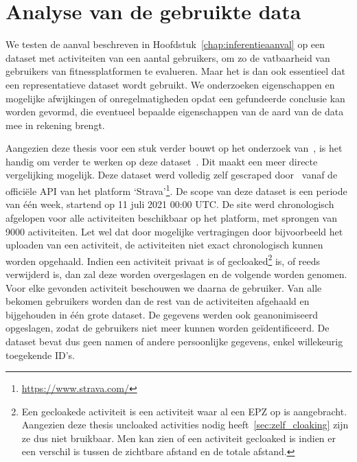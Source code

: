 \chapter{Analyse van de gebruikte data}
We testen de aanval beschreven in Hoofdstuk~\ref{chap:inferentieaanval} op een
dataset met activiteiten van een aantal gebruikers, om zo de vatbaarheid van
gebruikers van fitnessplatformen te evalueren. Maar het is dan ook essentieel
dat een representatieve dataset wordt gebruikt. We onderzoeken eigenschappen en
mogelijke afwijkingen of onregelmatigheden opdat een gefundeerde conclusie kan
worden gevormd, die eventueel bepaalde eigenschappen van de aard van de data
mee in rekening brengt.

Aangezien deze thesis voor een stuk verder bouwt op het onderzoek
van~\citeauthor{Dhondt}, is het handig om verder te werken op deze
dataset~\cite{Dhondt}. Dit maakt een meer directe vergelijking mogelijk.
Deze dataset werd volledig zelf gescraped door~\citeauthor{Dhondt} vanaf de
officiële \ac{API} van het platform
`Strava'\footnote{\url{https://www.strava.com/}}. De scope van deze dataset is
een periode van één week, startend op 11 juli 2021 00:00 \ac{UTC}. De site werd
chronologisch afgelopen voor alle activiteiten beschikbaar op het platform, met
sprongen van 9000 activiteiten. Let wel dat door mogelijke vertragingen door
bijvoorbeeld het uploaden van een activiteit, de activiteiten niet exact
chronologisch kunnen worden opgehaald. Indien een activiteit privaat is of
gecloaked\footnote{Een gecloakede activiteit is een activiteit waar al een EPZ
    op is aangebracht. Aangezien deze thesis uncloaked activities nodig
    heeft~\ref{sec:zelf_cloaking} zijn ze dus niet bruikbaar. Men kan zien of een
    activiteit gecloaked is indien er een verschil is tussen de zichtbare afstand
    en de totale afstand.} is, of reeds verwijderd is, dan zal deze worden
overgeslagen en de volgende worden genomen. Voor elke gevonden activiteit
beschouwen we daarna de gebruiker. Van alle bekomen gebruikers worden dan de
rest van de activiteiten afgehaald en bijgehouden in één grote dataset. De
gegevens werden ook geanonimiseerd opgeslagen, zodat de gebruikers niet meer
kunnen worden geïdentificeerd. De dataset bevat dus geen namen of andere
persoonlijke gegevens, enkel willekeurig toegekende ID's.


